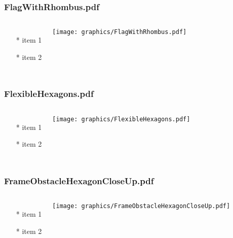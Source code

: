\documentclass{beamer}
\begin{document}
\begin{frame} \frametitle{FlagWithRhombus.pdf}
    \begin{columns}[c]
        \begin{itemize}
            \item[*] item 1
            \item[*] item 2
        \end{itemize}
        \begin{minipage}{\linewidth}
            \begin{center}
            \texttt{[image: graphics/FlagWithRhombus.pdf]}
            \label{gfx:FlagWithRhombus.pdf}
            \end{center}
        \end{minipage}
    \end{columns}
\end{frame}
\begin{frame} \frametitle{FlexibleHexagons.pdf}
    \begin{columns}[c]
        \begin{itemize}
            \item[*] item 1
            \item[*] item 2
        \end{itemize}
        \begin{minipage}{\linewidth}
            \begin{center}
            \texttt{[image: graphics/FlexibleHexagons.pdf]}
            \label{gfx:FlexibleHexagons.pdf}
            \end{center}
        \end{minipage}
    \end{columns}
\end{frame}
\begin{frame} \frametitle{FrameObstacleHexagonCloseUp.pdf}
    \begin{columns}[c]
        \begin{itemize}
            \item[*] item 1
            \item[*] item 2
        \end{itemize}
        \begin{minipage}{\linewidth}
            \begin{center}
            \texttt{[image: graphics/FrameObstacleHexagonCloseUp.pdf]}
            \label{gfx:FrameObstacleHexagonCloseUp.pdf}
            \end{center}
        \end{minipage}
    \end{columns}
\end{frame}
\end{document}
